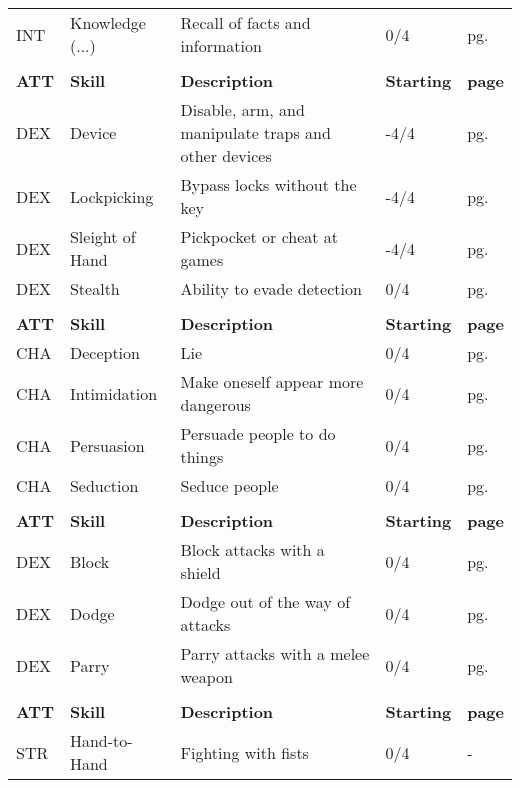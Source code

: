 \begin{center}
\begin{xltabular}{\textwidth}{l l X l l}
        INT & Knowledge (...) & Recall of facts and information & 0/4 & pg. \pageref{skill:knowledge} \\
         \\*
        \textbf{ATT} & \textbf{Skill} & \textbf{Description} & \textbf{Starting} & \textbf{page} \\*
        DEX & Device & Disable, arm, and manipulate traps and other devices & -4/4 & pg. \pageref{skill:device} \\
        DEX & Lockpicking & Bypass locks without the key & -4/4 & pg. \pageref{skill:lockpicking} \\
        DEX & Sleight of Hand & Pickpocket or cheat at games & -4/4 & pg. \pageref{skill:sleight-of-hand} \\
        DEX & Stealth & Ability to evade detection & 0/4 & pg. \pageref{skill:stealth} \\
         \\*
        \textbf{ATT} & \textbf{Skill} & \textbf{Description} & \textbf{Starting} & \textbf{page} \\*
        CHA & Deception & Lie & 0/4 & pg. \pageref{skill:deception} \\
        CHA & Intimidation & Make oneself appear more dangerous & 0/4 & pg. \pageref{skill:intimidation} \\
        CHA & Persuasion & Persuade people to do things & 0/4 & pg. \pageref{skill:persuasion} \\
        CHA & Seduction & Seduce people & 0/4 & pg. \pageref{skill:seduction} \\
         \\*
        \textbf{ATT} & \textbf{Skill} & \textbf{Description} & \textbf{Starting} & \textbf{page} \\*
        DEX & Block & Block attacks with a shield & 0/4 & pg. \pageref{skill:block} \\
        DEX & Dodge & Dodge out of the way of attacks & 0/4 & pg. \pageref{skill:dodge} \\
        DEX & Parry & Parry attacks with a melee weapon & 0/4 & pg. \pageref{skill:parry} \\
         \\*
        \textbf{ATT} & \textbf{Skill} & \textbf{Description} & \textbf{Starting} & \textbf{page} \\*
        STR & Hand-to-Hand & Fighting with fists & 0/4 & - \\

\end{xltabular}
\end{center}

